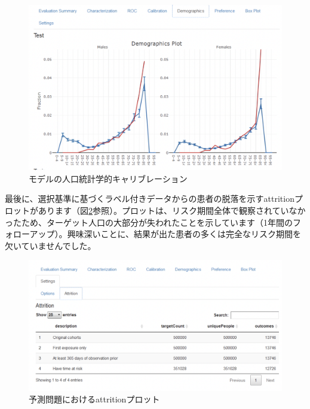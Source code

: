 \documentclass[
  11pt]{book}
\theoremstyle{definition}
\theoremstyle{definition}
\theoremstyle{definition}
\theoremstyle{definition}
\theoremstyle{remark}
\begin{document}
\begin{figure}

{\centering \includegraphics[width=1\linewidth]{images/PatientLevelPrediction/shiny/singleShiny/singleShinyDemo} 

}

\caption{モデルの人口統計学的キャリブレーション}\label{fig:shinyDemo}
\end{figure}

最後に、選択基準に基づくラベル付きデータからの患者の脱落を示すattritionプロットがあります（図\ref{fig:shinyAtt}参照）。プロットは、リスク期間全体で観察されていなかったため、ターゲット人口の大部分が失われたことを示しています（1年間のフォローアップ）。興味深いことに、結果が出た患者の多くは完全なリスク期間を欠いていませんでした。

\begin{figure}

{\centering \includegraphics[width=1\linewidth]{images/PatientLevelPrediction/shiny/singleShiny/singleShinyAtt} 

}

\caption{予測問題におけるattritionプロット}\label{fig:shinyAtt}
\end{figure}
\end{document}
